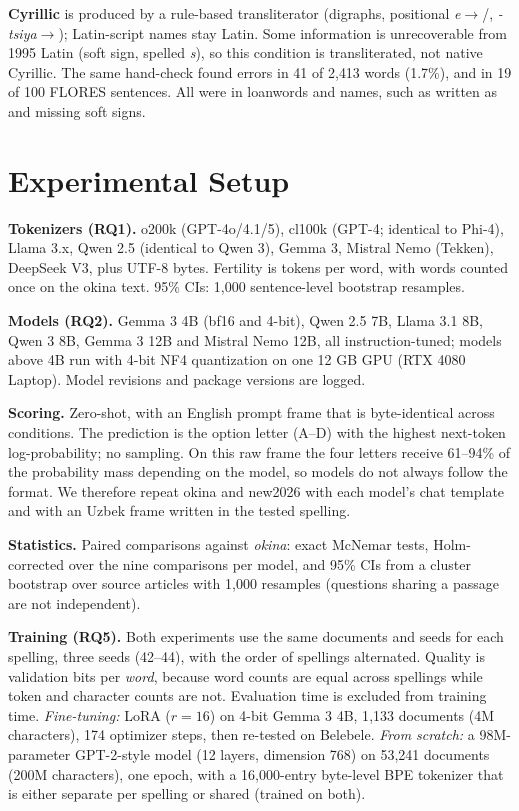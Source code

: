 \textbf{Cyrillic} is produced by a rule-based transliterator (digraphs, positional \emph{e}$\to$/, \emph{-tsiya}$\to$); Latin-script names stay Latin. Some information is unrecoverable from 1995 Latin (soft sign,  spelled \emph{s}), so this condition is transliterated, not native Cyrillic. The same hand-check found errors in 41 of 2{,}413 words (1.7\%), and in 19 of 100 FLORES sentences. All were in loanwords and names, such as  written as  and missing soft signs.

\section{Experimental Setup}
\textbf{Tokenizers (RQ1).} o200k (GPT-4o/4.1/5), cl100k (GPT-4; identical to Phi-4), Llama 3.x, Qwen 2.5 (identical to Qwen 3), Gemma 3, Mistral Nemo (Tekken), DeepSeek V3, plus UTF-8 bytes. Fertility is tokens per word, with words counted once on the okina text. 95\% CIs: 1{,}000 sentence-level bootstrap resamples.

\textbf{Models (RQ2).} Gemma 3 4B (bf16 and 4-bit), Qwen 2.5 7B, Llama 3.1 8B, Qwen 3 8B, Gemma 3 12B and Mistral Nemo 12B, all instruction-tuned; models above 4B run with 4-bit NF4 quantization \citep{dettmers2023qlora} on one 12 GB GPU (RTX 4080 Laptop). Model revisions and package versions are logged.

\textbf{Scoring.} Zero-shot, with an English prompt frame that is byte-identical across conditions. The prediction is the option letter (A--D) with the highest next-token log-probability; no sampling. On this raw frame the four letters receive 61--94\% of the probability mass depending on the model, so models do not always follow the format. We therefore repeat okina and new2026 with each model's chat template and with an Uzbek frame written in the tested spelling.

\textbf{Statistics.} Paired comparisons against \emph{okina}: exact McNemar tests, Holm-corrected over the nine comparisons per model, and 95\% CIs from a cluster bootstrap over source articles with 1{,}000 resamples (questions sharing a passage are not independent).

\textbf{Training (RQ5).} Both experiments use the same documents and seeds for each spelling, three seeds (42--44), with the order of spellings alternated. Quality is validation bits per \emph{word}, because word counts are equal across spellings while token and character counts are not. Evaluation time is excluded from training time. \emph{Fine-tuning:} LoRA ($r=16$) on 4-bit Gemma 3 4B, 1{,}133 documents (4M characters), 174 optimizer steps, then re-tested on Belebele. \emph{From scratch:} a 98M-parameter GPT-2-style model (12 layers, dimension 768) on 53{,}241 documents (200M characters), one epoch, with a 16{,}000-entry byte-level BPE tokenizer that is either separate per spelling or shared (trained on both).

